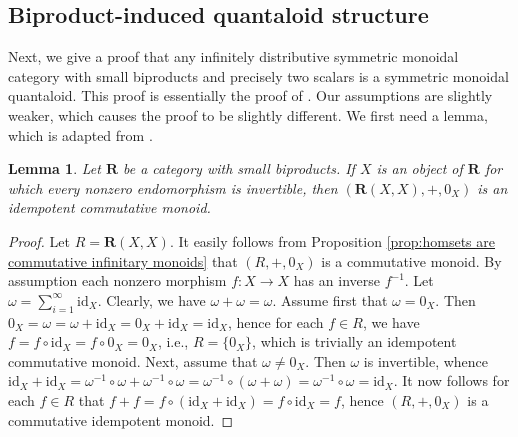\documentclass[12pt]{tac}
\newtheorem{lemma}[theorem]{Lemma}
\theoremstyle{definition}
\theoremstyle{remark}
\newcommand{\qedhere}{}
\newcommand{\<}{\langle}
\renewcommand{\>}{\rangle}
\renewcommand{\:}{\colon}
\newcommand{\id}{\mathrm{id}}
\begin{document}
\subsection{Biproduct-induced quantaloid structure}


Next, we give a proof that any infinitely distributive symmetric monoidal category with small biproducts and precisely two scalars is a symmetric monoidal quantaloid. This proof is essentially the proof of \cite[Proposition 4.3]{Kornell23}. Our assumptions are slightly weaker, which causes the proof to be slightly different. We first need a lemma, which is adapted from \cite[Lemma 4.1]{Kornell23}.

\begin{lemma}\label{lem:invertible endomorphisms}
    Let $\mathbf R$ be a category with small biproducts. If $X$ is an object of $\mathbf R$ for which every nonzero endomorphism is invertible, then $(\mathbf R(X,X),+,0_X)$ is an idempotent commutative monoid. 
\end{lemma}
\begin{proof}
Let $R=\mathbf R(X,X)$. It easily follows from Proposition \ref{prop:homsets are commutative infinitary monoids} that $(R,+,0_X)$ is a commutative monoid. By assumption each nonzero morphism $f:X\to X$ has an inverse $f^{-1}$. Let $\omega=\sum_{i=1}^\infty\id_X$. Clearly, we have $\omega+\omega=\omega$. Assume first that $\omega=0_X$. Then $0_X=\omega=\omega+\id_X=0_X+\id_X=\id_X$, hence for each $f\in R$, we have $f=f\circ\id_X=f\circ 0_X=0_X$, i.e., $R=\{0_X\}$, which is trivially an idempotent commutative monoid. Next, assume that $\omega\neq 0_X$. Then $\omega$ is invertible, whence $\id_X+\id_X=\omega^{-1}\circ\omega+\omega^{-1}\circ\omega=\omega^{-1}\circ(\omega+\omega)=\omega^{-1}\circ\omega=\id_X$. It now follows for each $f\in R$ that $f+f=f\circ(\id_X+\id_X)=f\circ\id_X=f$, hence  $(R,+,0_X)$ is a commutative idempotent monoid. \qedhere
\end{proof}
\end{document}
